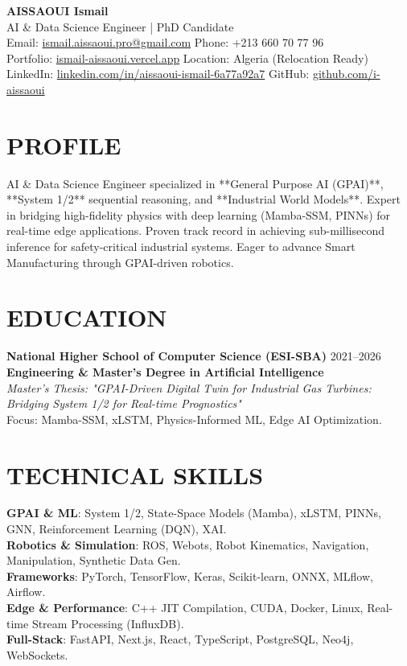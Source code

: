 \documentclass[a4paper,11pt]{article}
\begin{document}
\begin{center}
    {\Huge\bfseries\color{bosch_red} AISSAOUI Ismail}\\[4pt]
    {\Large AI \& Data Science Engineer | PhD Candidate}\\[6pt]

    {\normalsize
    Email: \href{mailto:ismail.aissaoui.pro@gmail.com}{ismail.aissaoui.pro@gmail.com} \quad
    Phone: +213 660 70 77 96 \\
    Portfolio: \href{https://ismail-aissaoui.vercel.app}{ismail-aissaoui.vercel.app} \quad
    Location: Algeria (Relocation Ready) \\
    LinkedIn: \href{https://linkedin.com/in/aissaoui-ismail-6a77a92a7}{linkedin.com/in/aissaoui-ismail-6a77a92a7} \quad
    GitHub: \href{https://github.com/i-aissaoui}{github.com/i-aissaoui}
    }
\end{center}

\section{PROFILE}
AI \& Data Science Engineer specialized in **General Purpose AI (GPAI)**, **System 1/2** sequential reasoning, and **Industrial World Models**. Expert in bridging high-fidelity physics with deep learning (Mamba-SSM, PINNs) for real-time edge applications. Proven track record in achieving sub-millisecond inference for safety-critical industrial systems. Eager to advance Smart Manufacturing through GPAI-driven robotics.

\section{EDUCATION}
\textbf{National Higher School of Computer Science (ESI-SBA)} \hfill 2021--2026 \\
\textbf{Engineering \& Master’s Degree in Artificial Intelligence} \\
\textit{Master's Thesis: "GPAI-Driven Digital Twin for Industrial Gas Turbines: Bridging System 1/2 for Real-time Prognostics"} \\
Focus: Mamba-SSM, xLSTM, Physics-Informed ML, Edge AI Optimization.

\section{TECHNICAL SKILLS}
\textbf{GPAI \& ML}: System 1/2, State-Space Models (Mamba), xLSTM, PINNs, GNN, Reinforcement Learning (DQN), XAI. \\
\textbf{Robotics \& Simulation}: ROS, Webots, Robot Kinematics, Navigation, Manipulation, Synthetic Data Gen. \\
\textbf{Frameworks}: PyTorch, TensorFlow, Keras, Scikit-learn, ONNX, MLflow, Airflow. \\
\textbf{Edge \& Performance}: C++ JIT Compilation, CUDA, Docker, Linux, Real-time Stream Processing (InfluxDB). \\
\textbf{Full-Stack}: FastAPI, Next.js, React, TypeScript, PostgreSQL, Neo4j, WebSockets.
\end{document}
